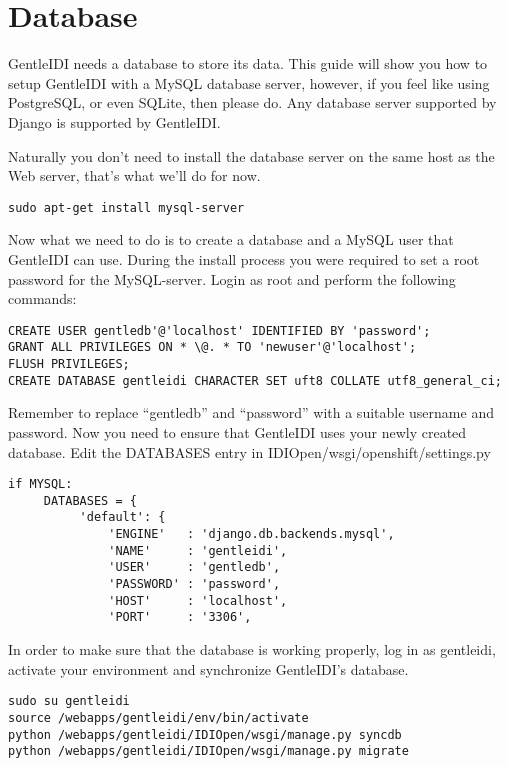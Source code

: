 \section{Database}
GentleIDI needs a database to store its data. This guide will show you
how to setup GentleIDI with a MySQL database server, however, if you
feel like using PostgreSQL, or even SQLite, then please do.
Any database server supported by Django is supported by GentleIDI.

Naturally you don't need to install the database server
on the same host as the Web server, that's what
we'll do for now.

\begin{verbatim}
sudo apt-get install mysql-server
\end{verbatim}

Now what we need to do is to create a database and a MySQL user that
GentleIDI can use. During the install process you were required to set
a root password for the MySQL-server. Login as root and perform the
following commands:

\begin{verbatim}
CREATE USER gentledb'@'localhost' IDENTIFIED BY 'password';
GRANT ALL PRIVILEGES ON * \@. * TO 'newuser'@'localhost';
FLUSH PRIVILEGES;
CREATE DATABASE gentleidi CHARACTER SET uft8 COLLATE utf8_general_ci;
\end{verbatim}

Remember to replace ``gentledb'' and ``password'' with a suitable username and
password. Now you need to ensure that GentleIDI uses your newly created
database. Edit the DATABASES entry in IDIOpen/wsgi/openshift/settings.py

\begin{verbatim}
if MYSQL:
     DATABASES = {
          'default': {
              'ENGINE'   : 'django.db.backends.mysql',
              'NAME'     : 'gentleidi',
              'USER'     : 'gentledb',
              'PASSWORD' : 'password',
              'HOST'     : 'localhost',
              'PORT'     : '3306',
\end{verbatim}

In order to make sure that the database is working properly, log in as
gentleidi, activate your environment and synchronize
GentleIDI's database.

\begin{verbatim}
sudo su gentleidi
source /webapps/gentleidi/env/bin/activate
python /webapps/gentleidi/IDIOpen/wsgi/manage.py syncdb
python /webapps/gentleidi/IDIOpen/wsgi/manage.py migrate
\end{verbatim}

